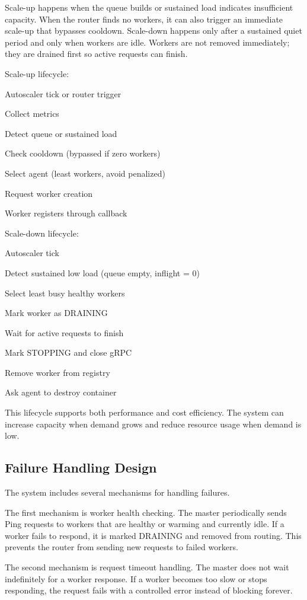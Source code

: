 Scale-up happens when the queue builds or sustained load indicates insufficient capacity. When the router finds no workers, it can also trigger an immediate scale-up that bypasses cooldown. Scale-down happens only after a sustained quiet period and only when workers are idle. Workers are not removed immediately; they are drained first so active requests can finish.

Scale-up lifecycle:
\begin{center}
Autoscaler tick or router trigger

Collect metrics

Detect queue or sustained load

Check cooldown (bypassed if zero workers)

Select agent (least workers, avoid penalized)

Request worker creation

Worker registers through callback
\end{center}

Scale-down lifecycle:
\begin{center}
Autoscaler tick

Detect sustained low load (queue empty, inflight = 0)

Select least busy healthy workers

Mark worker as DRAINING

Wait for active requests to finish

Mark STOPPING and close gRPC

Remove worker from registry

Ask agent to destroy container
\end{center}

This lifecycle supports both performance and cost efficiency. The system can increase capacity when demand grows and reduce resource usage when demand is low.

\subsection{Failure Handling Design}
The system includes several mechanisms for handling failures.

The first mechanism is worker health checking. The master periodically sends Ping requests to workers that are healthy or warming and currently idle. If a worker fails to respond, it is marked DRAINING and removed from routing. This prevents the router from sending new requests to failed workers.

The second mechanism is request timeout handling. The master does not wait indefinitely for a worker response. If a worker becomes too slow or stops responding, the request fails with a controlled error instead of blocking forever.


